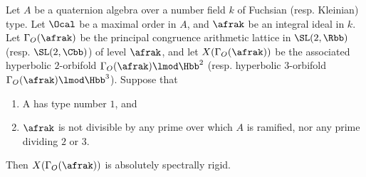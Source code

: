 



\begin{thm}
  Let $A$ be a quaternion algebra over a number field $k$ of Fuchsian (resp. Kleinian) type. Let $\Ocal$ be a maximal order in $A$, and $\afrak$ be an integral ideal in $k$.  Let $\Gamma_O(\afrak)$ be the principal congruence arithmetic lattice in $\SL(2,\Rbb)$ (resp. $\SL(2,\Cbb)$) of level $\afrak$, and let $X(\Gamma_O(\afrak))$ be the associated hyperbolic $2$-orbifold $\Gamma_O(\afrak) \lmod \Hbb^2$ (resp. hyperbolic $3$-orbifold $\Gamma_O(\afrak) \lmod \Hbb^3$). Suppose that
  \begin{enumerate}
    \item A has type number $1$, and
    \item $\afrak$ is not divisible by any prime over which  $A$ is ramified, nor any prime dividing $2$ or $3$.
  \end{enumerate}
  Then $X(\Gamma_O (\afrak))$ is absolutely spectrally rigid.
\end{thm}

